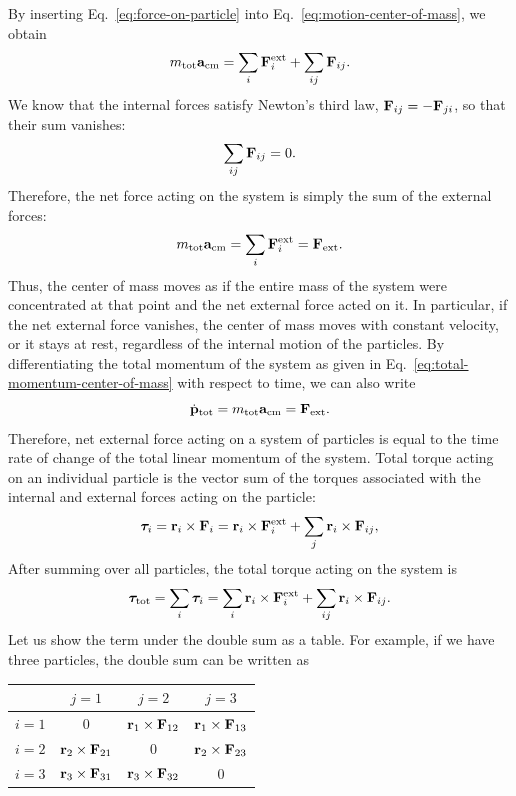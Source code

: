 \documentclass[12pt]{article}
\begin{document}
By inserting Eq.~\eqref{eq:force-on-particle} into Eq.~\eqref{eq:motion-center-of-mass}, we obtain
\[
    m_{\text{tot}}\vb{a}_{\text{cm}} = \sum_{i}\vb{F}_i^{\mathrm{ext}} + \sum_{ij}\vb{F}_{ij}.
\]
We know that the internal forces satisfy Newton's third law, $\vb{F}_{ij}=-\vb{F}_{ji}$, so that their sum vanishes:
\[
    \sum_{ij}\vb{F}_{ij}=0.
\]
Therefore, the net force acting on the system is simply the sum of the external forces:
\begin{equation}
    m_{\text{tot}}\vb{a}_{\text{cm}} = \sum_{i}\vb{F}_i^{\mathrm{ext}} = \vb{F}_{\mathrm{ext}}.
\end{equation}
Thus, the center of mass moves as if the entire mass
of the system were concentrated at that point and
the net external force acted on it. In particular, if the net external force vanishes, the center of mass moves with constant velocity, or it stays at rest, regardless of the internal motion of the particles. By differentiating the total momentum of the system as given in Eq.~\eqref{eq:total-momentum-center-of-mass} with respect to time, we can also write
\begin{equation}
    \dot{\vb{p}}_{\text{tot}} = m_{\text{tot}}\vb{a}_{\text{cm}} = \vb{F}_{\mathrm{ext}}.
    \label{eq:momentum-center-of-mass}
\end{equation}
Therefore, net external force acting on a system of particles is equal to the time rate of change of the total linear momentum of the system. Total torque acting on an individual particle is the vector sum of the torques associated with the internal and external forces acting on the particle:
\[
    \bm{\tau}_i = \vb{r}_i \times \vb{F}_i = \vb{r}_i \times \vb{F}_i^{\mathrm{ext}} + \sum_{j}\vb{r}_i \times \vb{F}_{ij},
\]
After summing over all particles, the total torque acting on the system is
\[
    \bm{\tau}_{\text{tot}} = \sum_i \bm{\tau}_i = \sum_i \vb{r}_i \times \vb{F}_i^{\mathrm{ext}} + \sum_{ij}\vb{r}_i \times \vb{F}_{ij}.
\]
Let us show the term under the double sum as a table. For example, if  we have three particles, the double sum can be written as
\begin{center}
\begin{tabular}{|c|c|c|c|}
\hline
 & $j=1$ & $j=2$ & $j=3$ \\
\hline
$i=1$ & 0 & $\vb{r}_1 \times \vb{F}_{12}$ & $\vb{r}_1 \times \vb{F}_{13}$ \\
$i=2$ & $\vb{r}_2 \times \vb{F}_{21}$ & 0 & $\vb{r}_2 \times \vb{F}_{23}$ \\
$i=3$ & $\vb{r}_3 \times \vb{F}_{31}$ & $\vb{r}_3 \times \vb{F}_{32}$ & 0 \\
\hline
\end{tabular}
\end{center}
\end{document}
